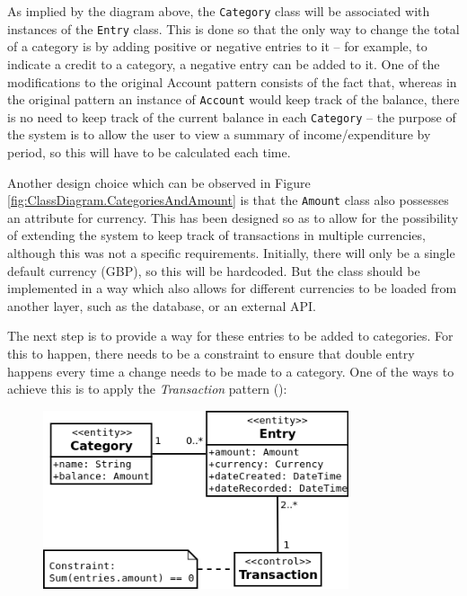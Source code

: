 As implied by the diagram above, the \texttt{Category} class will be associated
with instances of the \texttt{Entry} class. This is done so that the only way to
change the total of a category is by adding positive or negative entries to it
-- for example, to indicate a credit to a category, a negative entry can be
added to it. One of the modifications to the original Account pattern consists
of the fact that, whereas in the original pattern an instance of
\texttt{Account} would keep track of the balance, there is no need to keep
track of the current balance in each \texttt{Category} -- the purpose of the
system is to allow the user to view a summary of income/expenditure by period,
so this will have to be calculated each time.

Another design choice which can be observed in Figure
\ref{fig:ClassDiagram.CategoriesAndAmount} is that the \texttt{Amount} class
also possesses an attribute for currency. This has been designed so as to allow
for the possibility of extending the system to keep track of transactions in
multiple currencies, although this was not a specific requirements. Initially,
there will only be a single default currency (GBP), so this will be hardcoded.
But the class should be implemented in a way which also allows for different
currencies to be loaded from another layer, such as the database, or an
external API.

The next step is to provide a way for these entries to be added to categories.
For this to happen, there needs to be a constraint to ensure that double entry
happens every time a change needs to be made to a category. One of the ways to
achieve this is to apply the \emph{Transaction} pattern
(\cite[][Section~6.2]{fowler1997analysis}):
\begin{figure}[ht!]
  \begin{center}
    \includegraphics[width=9cm]{./contents/img/Class_Diagram_-_Transaction.png}
  \end{center}
  \caption{}
  \label{fig:ClassDiagram.Transaction}
\end{figure}
\FloatBarrier

